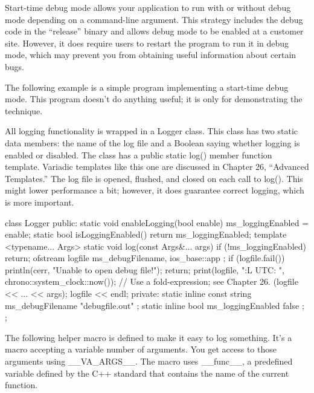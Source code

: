 
Start-time debug mode allows your application to run with or without debug mode depending on a command-line argument. This strategy includes the debug code in the “release” binary and allows debug mode to be enabled at a customer site. However, it does require users to restart the program to run it in debug mode, which may prevent you from obtaining useful information about certain bugs.

The following example is a simple program implementing a start-time debug mode. This program doesn’t do anything useful; it is only for demonstrating the technique.

All logging functionality is wrapped in a Logger class. This class has two static data members: the name of the log file and a Boolean saying whether logging is enabled or disabled. The class has a public static log() member function template. Variadic templates like this one are discussed in Chapter 26, “Advanced Templates.” The log file is opened, flushed, and closed on each call to log(). This might lower performance a bit; however, it does guarantee correct logging, which is more important.

\begin{cpp}
class Logger
{
    public:
        static void enableLogging(bool enable) { ms_loggingEnabled = enable; }
        static bool isLoggingEnabled() { return ms_loggingEnabled; }
        template <typename... Args>
        static void log(const Args&... args)
        {
            if (!ms_loggingEnabled) { return; }
            ofstream logfile { ms_debugFilename, ios_base::app };
            if (logfile.fail()) {
                println(cerr, "Unable to open debug file!");
                return;
            }
            print(logfile, "{:L} UTC: ", chrono::system_clock::now());
            // Use a fold-expression; see Chapter 26.
            (logfile << ... << args);
            logfile << endl;
        }
    private:
        static inline const string ms_debugFilename { "debugfile.out" };
        static inline bool ms_loggingEnabled { false };
};
\end{cpp}

The following helper macro is defined to make it easy to log something. It’s a macro accepting a variable number of arguments. You get access to those arguments using \_\_VA\_ARGS\_\_. The macro uses \_\_func\_\_, a predefined variable defined by the C++ standard that contains the name of the current function.

